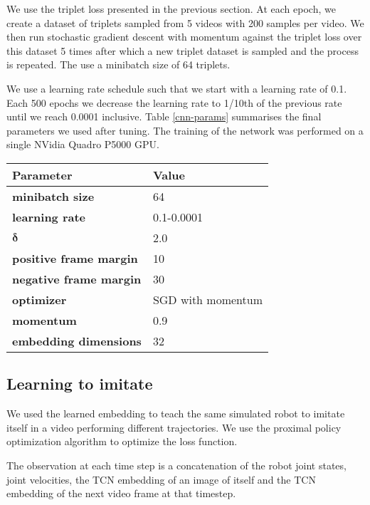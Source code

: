 We use the triplet loss presented in the previous section. At each epoch, we create a dataset of triplets sampled from 5 videos with 200 samples per video. We then run stochastic gradient descent with momentum against the triplet loss over this dataset 5 times after which a new triplet dataset is sampled and the process is repeated. The use a minibatch size of 64 triplets.

We use a learning rate schedule such that we start with a learning rate of 0.1. Each 500 epochs we decrease the learning rate to 1/10th of the previous rate until we reach 0.0001 inclusive. Table \ref{cnn-params} summarises the final parameters we used after tuning. The training of the network was performed on a single NVidia Quadro P5000 GPU.

{
    \vspace{0.5cm}
    \centering
    \begin{tabular}{@{}ll@{}}
    \toprule
    \textbf{Parameter}             & \textbf{Value}    \\ \midrule
    \textbf{minibatch size}        & 64                \\
    \textbf{learning rate}         & 0.1-0.0001        \\
    $\boldsymbol{\delta}$                & 2.0               \\
    \textbf{positive frame margin} & 10                \\
    \textbf{negative frame margin} & 30                \\
    \textbf{optimizer}             & SGD with momentum \\
    \textbf{momentum}              & 0.9               \\
    \textbf{embedding dimensions}  & 32
    \end{tabular}
    \label{cnn-params}
}

\subsection{Learning to imitate}

We used the learned embedding to teach the same simulated robot to imitate itself in a video performing different trajectories. We use the proximal policy optimization algorithm to optimize the loss function.

The observation at each time step is a concatenation of the robot joint states, joint velocities, the TCN embedding of an image of itself and the TCN embedding of the next video frame at that timestep.

